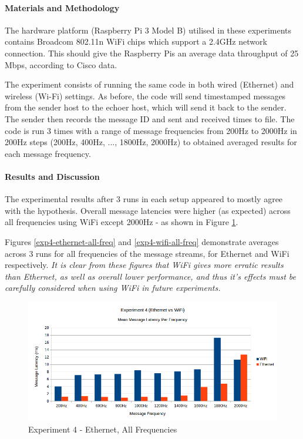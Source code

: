 \documentclass[../dissertation.tex]{subfiles}
\begin{document}
\paragraph{Materials and Methodology} The hardware platform (Raspberry Pi 3 Model B) utilised in these experiments contains Broadcom 802.11n WiFi chips which support a 2.4GHz network connection. This should give the Raspberry Pis an average data throughput of 25 Mbps, according to Cisco data\cite{florwick2013wireless}.

The experiment consists of running the same code in both wired (Ethernet) and wireless (Wi-Fi) settings. As before, the code will send timestamped messages from the sender host to the echoer host, which will send it back to the sender. The sender then records the message ID and sent and received times to file. The code is run 3 times with a range of message frequencies from 200Hz to 2000Hz in 200Hz steps (200Hz, 400Hz, ..., 1800Hz, 2000Hz) to obtained averaged results for each message frequency.

\paragraph{Results and Discussion} The experimental results after 3 runs in each setup appeared to mostly agree with the hypothesis. Overall message latencies were higher (as expected) across all frequencies using WiFi except 2000Hz - as shown in Figure \ref{exp4-means-all-freq}.

Figures \ref{exp4-ethernet-all-freq} and \ref{exp4-wifi-all-freq} demonstrate averages across 3 runs for all frequencies of the message streams, for Ethernet and WiFi respectively. \textit{It is clear from these figures that WiFi gives more erratic results than Ethernet, as well as overall lower performance, and thus it's effects must be carefully considered when using WiFi in future experiments.}

\begin{figure}[H]
\centering
\includegraphics[width=\textwidth]{images/experiment4/mean_per_frequency.png}
\caption{Experiment 4 - Ethernet, All Frequencies}
\label{exp4-means-all-freq}
\end{figure}
\end{document}
